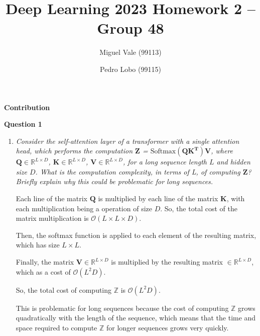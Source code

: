 \documentclass[12pt]{article}
\title{\large{Deep Learning 2023}\vskip 0.2cm Homework 2 -- Group 48}
\date{}
\author{Miguel Vale (99113) \and Pedro Lobo (99115)}
\begin{document}
\maketitle

\center\large{\vskip -1.0cm\textbf{Contribution}}

\begin{justify}
\end{justify}

\center\large{\vskip 0.5cm\textbf{Question 1}}
\begin{enumerate}[leftmargin=\labelsep]

    \item \textit{Consider the self-attention layer of a transformer with a single attention head, which performs the computation $\mathbf{Z}$ = $\text{Softmax}(\mathbf{QK^T})\mathbf{V}$, where $\mathbf{Q} \in \mathbb{R}^{L \times D}$, $\mathbf{K} \in \mathbb{R}^{L \times D}$, $\mathbf{V} \in \mathbb{R}^{L \times D}$, for a long sequence length $L$ and hidden size $D$. What is the computation complexity, in terms of L, of computing $\mathbf{Z}$? Briefly explain why this could be problematic for long sequences.}

          \vspace{12pt}

          Each line of the matrix $\mathbf{Q}$ is multiplied by each line of the matrix $\mathbf{K}$, with each multiplication being a operation of size $D$. So, the total cost of the matrix multiplication is $\mathcal{O} (L \times L \times D)$.

          \vspace{12pt}

          Then, the softmax function is applied to each element of the resulting matrix, which has size $L \times L$.

          \vspace{12pt}

          Finally, the matrix $\mathbf{V} \in \mathbb{R}^{L \times D}$ is multiplied by the resulting matrix $\in \mathbb{R}^{L \times D}$, which as a cost of $\mathcal{O}(L^2D)$.

          \vspace{12pt}

          So, the total cost of computing $\mathbb{Z}$ is $\mathcal{O} (L^2 D)$.

          \vspace{12pt}

          This is problematic for long sequences because the cost of computing $\mathbb{Z}$ grows quadratically with the length of the sequence, which means that the time and space required to compute $\mathbb{Z}$ for longer sequences grows very quickly.


\end{enumerate}
\end{document}
